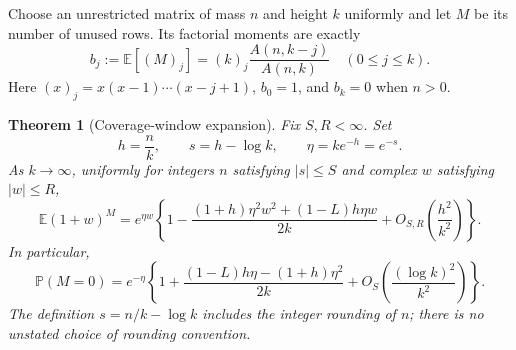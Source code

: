 \documentclass[11pt]{article}
\numberwithin{equation}{section}
\newtheorem{theorem}{Theorem}[section]
\theoremstyle{definition}
\theoremstyle{remark}
\begin{document}
Choose an unrestricted matrix of mass $n$ and height $k$ uniformly and let $M$ be its
number of unused rows.  Its factorial moments are exactly
\begin{equation}\label{mxc:eq:pc-moments}
 b_j:=\mathbb E[(M)_j]
 =(k)_j\frac{A(n,k-j)}{A(n,k)}\quad(0\leq j\leq k).
\end{equation}
Here $(x)_j=x(x-1)\cdots(x-j+1)$, $b_0=1$, and $b_k=0$ when $n>0$.

\begin{theorem}[Coverage-window expansion]\label{mxc:thm:pc-pgf}
Fix $S,R<\infty$.  Set
\[
 h=\frac nk,\qquad s=h-\log k,\qquad
 \eta=k e^{-h}=e^{-s}.
\]
As $k\to\infty$, uniformly for integers $n$ satisfying $|s|\leq S$
and complex $w$ satisfying $|w|\leq R$,
\begin{equation}\label{mxc:eq:pc-pgf}
 \mathbb E(1+w)^M
 =e^{\eta w}\left\{
 1-\frac{(1+h)\eta^2w^2+(1-L)h\eta w}{2k}
 +O_{S,R}\!\left(\frac{h^2}{k^2}\right)\right\}.
\end{equation}
In particular,
\begin{equation}\label{mxc:eq:pc-zero}
 \mathbb P(M=0)
 =e^{-\eta}\left\{
 1+\frac{(1-L)h\eta-(1+h)\eta^2}{2k}
 +O_S\!\left(\frac{(\log k)^2}{k^2}\right)\right\}.
\end{equation}
The definition $s=n/k-\log k$ includes the integer rounding of $n$;
there is no unstated choice of rounding convention.
\end{theorem}
\end{document}
